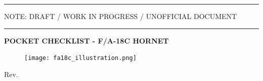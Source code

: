 \begin{titlepage}
\begin{center}
        \vspace*{0.35cm}
        
        \hrule
       	    
        \vspace{.5cm}
        
        \begin{center}
          \small
          \large{
            NOTE: DRAFT / WORK IN PROGRESS / UNOFFICIAL DOCUMENT
          }        
        \end{center}

        \vspace{.5cm}

        \hrule

        \vspace{1.5cm}

        \begin{center}
          \small
          \LARGE{
            \textbf{POCKET CHECKLIST - F/A-18C HORNET}
          }
        \end{center}

        \vspace{.5cm}

        \begin{figure}[!ht]
          \centering
          \texttt{[image: fa18c\_illustration.png]}
          \label{fig:fa18c_illustration}
        \end{figure}

        \vfill
        
        \normalsize
        Rev. \revisionNumber
        
	\end{center}
\end{titlepage}

